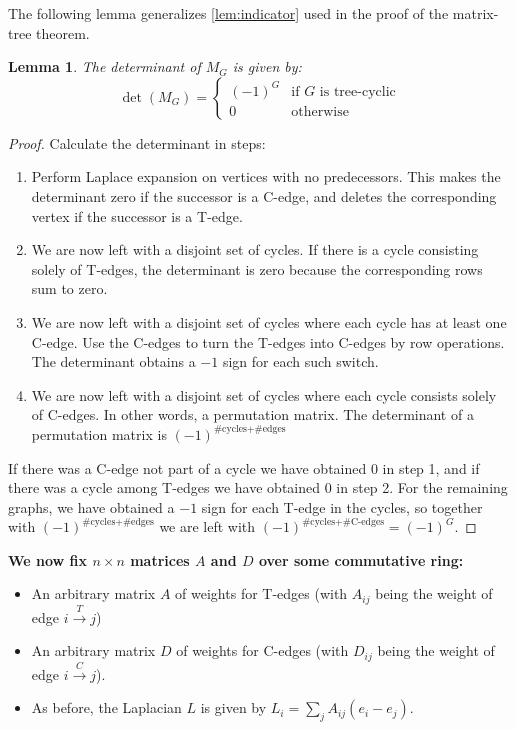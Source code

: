 \documentclass[a4paper, 11pt]{article}
\newtheorem{lemma}{Lemma}[section]
\theoremstyle{definition}
\begin{document}
The following lemma generalizes \cref{lem:indicator} used in the proof of the matrix-tree theorem.

\begin{lemma}
  \label{lem:tcindicator}
  The determinant of $M_G$ is given by:
  \[
    \det(M_G) = \begin{cases}
      (-1)^G & \text{if $G$ is tree-cyclic} \\
      0 & \text{otherwise}
    \end{cases}
  \]
\end{lemma}

\begin{proof}
  Calculate the determinant in steps:
  \begin{enumerate}
    \item Perform Laplace expansion on vertices with no predecessors. This makes the determinant zero if the successor is a C-edge, and deletes the corresponding vertex if the successor is a T-edge.
    \item We are now left with a disjoint set of cycles. If there is a cycle consisting solely of T-edges, the determinant is zero because the corresponding rows sum to zero.
    \item We are now left with a disjoint set of cycles where each cycle has at least one C-edge. Use the C-edges to turn the T-edges into C-edges by row operations. The determinant obtains a $-1$ sign for each such switch.
    \item We are now left with a disjoint set of cycles where each cycle consists solely of C-edges. In other words, a permutation matrix. The determinant of a permutation matrix is $(-1)^{\text{\#cycles} + \text{\#edges}}$
  \end{enumerate}
  If there was a C-edge not part of a cycle we have obtained $0$ in step 1, and if there was a cycle among T-edges we have obtained $0$ in step 2. For the remaining graphs, we have obtained a $-1$ sign for each T-edge in the cycles, so together with $(-1)^{\text{\#cycles} + \text{\#edges}}$ we are left with $(-1)^{\text{\#cycles} + \text{\#C-edges}} = (-1)^G$.
\end{proof}

\textbf{We now fix $n\times n$ matrices $A$ and $D$ over some commutative ring:}

\begin{itemize}
  \item An arbitrary matrix $A$ of weights for T-edges (with $A_{ij}$ being the weight of edge $i \xrightarrow{T} j$)
  \item An arbitrary matrix $D$ of weights for C-edges (with $D_{ij}$ being the weight of edge $i \xrightarrow{C} j$).
  \item As before, the Laplacian $L$ is given by $L_i = \sum_j A_{ij}(e_i - e_j)$.
\end{itemize}
\end{document}
